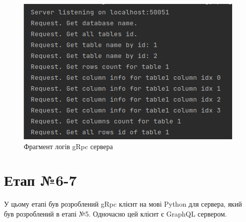 \documentclass[a4paper, 12pt]{article}
\begin{document}
\begin{figure}[H]
\centering
\includegraphics[scale=0.5]{resources/gRpcServerLogs.png}
\caption{Фрагмент логів gRpc сервера}
\end{figure}

\section{Етап №6-7}
У цьому етапі був розроблений gRpc клієнт на мові Python для сервера, який був розроблений в етапі №5. Одночасно цей клієнт є GraphQL сервером.
\end{document}

